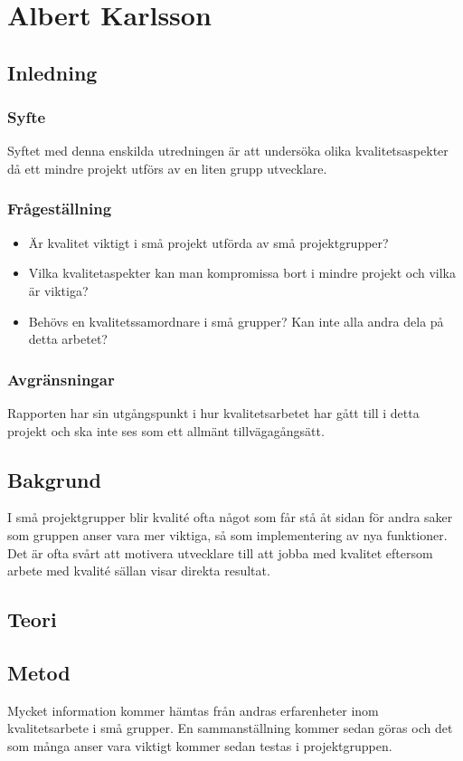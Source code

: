 \section{Albert Karlsson}
\subsection{Inledning}

\subsubsection{Syfte}
Syftet med denna enskilda utredningen är att undersöka olika kvalitetsaspekter då ett mindre projekt utförs av en liten grupp utvecklare.
\subsubsection{Frågeställning}
\begin{itemize}
\item Är kvalitet viktigt i små projekt utförda av små projektgrupper?
\item Vilka kvalitetaspekter kan man kompromissa bort i mindre projekt och vilka är viktiga?
\item Behövs en kvalitetssamordnare i små grupper? Kan inte alla andra dela på detta arbetet?

\end{itemize}
\subsubsection{Avgränsningar}
Rapporten har sin utgångspunkt i hur kvalitetsarbetet har gått till i detta projekt och ska inte ses som ett allmänt tillvägagångsätt. 
\subsection{Bakgrund}
I små projektgrupper blir kvalité ofta något som får stå åt sidan för andra saker som gruppen anser vara mer viktiga, så som implementering av nya funktioner. Det är ofta svårt att motivera utvecklare till att jobba med kvalitet eftersom arbete med kvalité sällan visar direkta resultat. 
\subsection{Teori}
\subsection{Metod}
Mycket information kommer hämtas från andras erfarenheter inom kvalitetsarbete i små grupper. En sammanställning kommer sedan göras och det som många anser vara viktigt kommer sedan testas i projektgruppen.    

